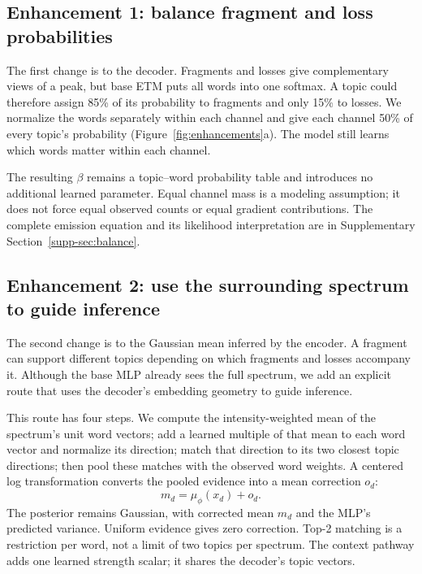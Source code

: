 \documentclass[10pt,a4paper]{article}
\begin{document}
\subsection{Enhancement 1: balance fragment and loss probabilities}

The first change is to the decoder. Fragments and losses give complementary
views of a peak, but base ETM puts all words into one softmax. A topic could
therefore assign 85\% of its probability to fragments and only 15\% to losses.
We normalize the words separately within each channel and give each channel
50\% of every topic's probability (Figure~\ref{fig:enhancements}a).
The model still learns which words matter within each channel.



The resulting $\beta$ remains a topic--word probability table and introduces
no additional learned parameter. Equal channel mass is a modeling assumption;
it does not force equal observed counts or equal gradient contributions.
The complete emission equation and its likelihood interpretation are in
Supplementary Section~\ref{supp-sec:balance}.

\subsection{Enhancement 2: use the surrounding spectrum to guide inference}

The second change is to the Gaussian mean inferred by the encoder. A fragment
can support different topics depending on which fragments and losses accompany
it. Although the base MLP already sees the full spectrum, we add an explicit
route that uses the decoder's embedding geometry to guide inference.

This route has four steps. We compute the intensity-weighted mean of the
spectrum's unit word vectors; add a learned multiple of that mean to each word
vector and normalize its direction; match that direction to its two closest
topic directions; then pool these matches with the observed word weights.
A centered log transformation converts the pooled evidence into a mean
correction $o_d$:
\begin{equation}
 m_d=\mu_\phi(x_d)+o_d.
 \label{eq:main-offset}
\end{equation}
The posterior remains Gaussian, with corrected mean $m_d$ and the MLP's
predicted variance. Uniform evidence gives zero correction. Top-2 matching
is a restriction per word, not a limit of two topics per spectrum. The
context pathway adds one learned strength scalar; it shares the decoder's
topic vectors.
\end{document}
